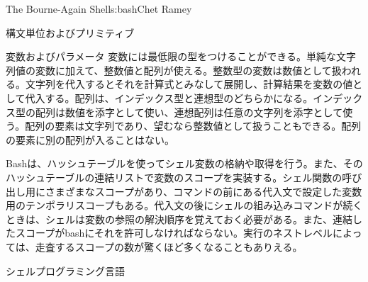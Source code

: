\begin{aosachapter}{The Bourne-Again Shell}{s:bash}{Chet Ramey}
\begin{aosasect1}{構文単位およびプリミティブ}
\begin{aosasect2}{変数およびパラメータ}
変数には最低限の型をつけることができる。単純な文字列値の変数に加えて、整数値と配列が使える。整数型の変数は数値として扱われる。文字列を代入するとそれを計算式とみなして展開し、計算結果を変数の値として代入する。配列は、インデックス型と連想型のどちらかになる。インデックス型の配列は数値を添字として使い、連想配列は任意の文字列を添字として使う。配列の要素は文字列であり、望むなら整数値として扱うこともできる。配列の要素に別の配列が入ることはない。

Bashは、ハッシュテーブルを使ってシェル変数の格納や取得を行う。また、そのハッシュテーブルの連結リストで変数のスコープを実装する。シェル関数の呼び出し用にさまざまなスコープがあり、コマンドの前にある代入文で設定した変数用のテンポラリスコープもある。代入文の後にシェルの組み込みコマンドが続くときは、シェルは変数の参照の解決順序を覚えておく必要がある。また、連結したスコープがbashにそれを許可しなければならない。実行のネストレベルによっては、走査するスコープの数が驚くほど多くなることもありえる。

\end{aosasect2}

\begin{aosasect2}{シェルプログラミング言語}


\end{aosasect2}
\end{aosasect1}
\end{aosachapter}

